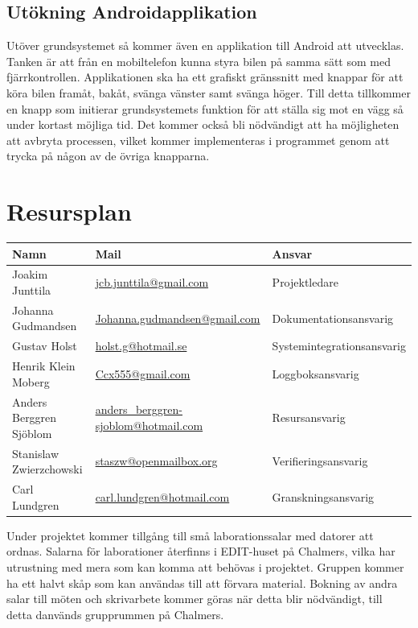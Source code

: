 \documentclass[a4paper]{article}
\begin{document}
\subsection{Utökning Androidapplikation}
Utöver grundsystemet så kommer även en applikation till Android att utvecklas. Tanken är att från en mobiltelefon kunna styra bilen på samma sätt som med fjärrkontrollen. Applikationen ska ha ett grafiskt gränssnitt med knappar för att köra bilen framåt, bakåt, svänga vänster samt svänga höger. Till detta tillkommer en knapp som initierar grundsystemets funktion för att ställa sig mot en vägg så under kortast möjliga tid. Det kommer också bli nödvändigt att ha möjligheten att avbryta processen, vilket kommer implementeras i programmet genom att trycka på någon av de övriga knapparna.

\section{Resursplan}

\begin{tabular}{|l|l|l|}  \hline
 \bf Namn                & \bf Mail                                  & \bf Ansvar                 \\ \hline \hline
 Joakim Junttila         & \url{jcb.​junttila@gmail.​com}              & Projektledare              \\ \hline
 Johanna Gudmandsen      & \url{Johanna.gudmandsen@gmail.com}        & Dokumentationsansvarig     \\ \hline
 Gustav Holst            & \url{holst.g@hotmail.se}                  & Systemintegrationsansvarig \\ \hline
 Henrik Klein Moberg     & \url{Ccx555@gmail.com}                    & Loggboksansvarig           \\ \hline
 Anders Berggren Sjöblom & \url{anders_berggren-sjoblom@hotmail.com} & Resursansvarig             \\ \hline
 Stanislaw Zwierzchowski & \url{staszw@openmailbox.org}              & Verifieringsansvarig       \\ \hline
 Carl Lundgren           & \url{carl.lundgren@hotmail.com}           & Granskningsansvarig        \\ \hline
\end{tabular}

\vspace{5mm}
\noindent Under projektet kommer tillgång till små laborationssalar med datorer att ordnas. Salarna för laborationer återfinns i EDIT-huset på Chalmers, vilka har utrustning med mera som kan komma att behövas i projektet. Gruppen kommer ha ett halvt skåp som kan användas till att förvara material. Bokning av andra salar till möten och skrivarbete kommer göras när detta blir nödvändigt, till detta danvänds grupprummen på Chalmers.
\end{document}
